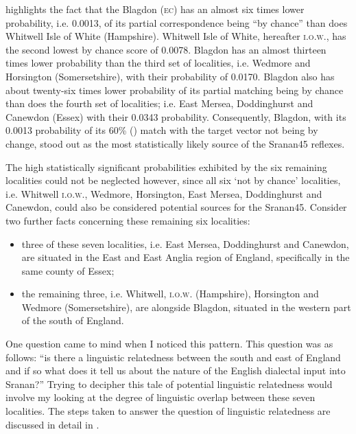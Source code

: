  highlights the fact that the Blagdon (\textsc{ec}) has an almost six times lower probability, i.e. 0.0013, of its partial correspondence being ``by chance'' than does Whitwell Isle of White (Hampshire). Whitwell Isle of White, hereafter \textsc{i.o.w}., has the second lowest by chance score of 0.0078. Blagdon has an almost thirteen times lower probability than the third set of localities, i.e. Wedmore and Horsington (Somersetshire), with their probability of 0.0170. Blagdon also has about twenty-six times lower probability of its partial matching being by chance than does the fourth set of localities; i.e. East Mersea, Doddinghurst and Canewdon (Essex) with their 0.0343 probability. Consequently, Blagdon, with its 0.0013 probability of its 60\% () match with the target vector not being by change, stood out as the most statistically likely source of the Sranan45 reflexes.

The high statistically significant probabilities exhibited by the six remaining localities could not be neglected however, since all six `not by chance' localities, i.e. Whitwell \textsc{i.o.w}., Wedmore, Horsington, East Mersea, Doddinghurst and Canewdon, could also be considered potential sources for the Sranan45. Consider two further facts concerning these remaining six localities:

\begin{itemize}
\item {three of these seven localities, i.e. East Mersea, Doddinghurst and Canewdon, are situated in the East and East Anglia region of England, specifically in the same county of Essex;}
\item {the remaining three, i.e. Whitwell, \textsc{i.o.w}. (Hampshire), Horsington and Wedmore (Somersetshire), are alongside Blagdon, situated in the western part of the south of England.}
\end{itemize}

One question came to mind when I noticed this pattern. This question was as follows: ``is there a linguistic relatedness between the south and east of England and if so what does it tell us about the nature of the English dialectal input into Sranan?'' Trying to decipher this tale of potential linguistic relatedness would involve my looking at the degree of linguistic overlap between these seven localities. The steps taken to answer the question of linguistic relatedness are discussed in detail in .

